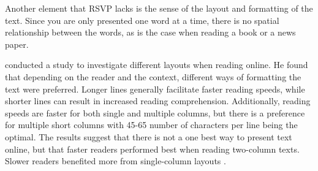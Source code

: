 Another element that RSVP lacks is the sense of the layout and formatting of the text. Since you are only presented one word at a time, there is no spatial relationship between the words, as is the case when reading a book or a news paper.

 conducted a study to investigate different layouts when reading online. He found that depending on the reader and the context, different ways of formatting the text were preferred. Longer lines generally facilitate faster reading speeds, while shorter lines can result in increased reading comprehension. Additionally, reading speeds are faster for both single and multiple columns, but there is a preference for multiple short columns with 45-65 number of characters per line being the optimal. The results suggest that there is not a one best way to present text online, but that faster readers performed best when reading two-column texts. Slower readers benefited more from single-column layouts \cite{baker_is_2005}.